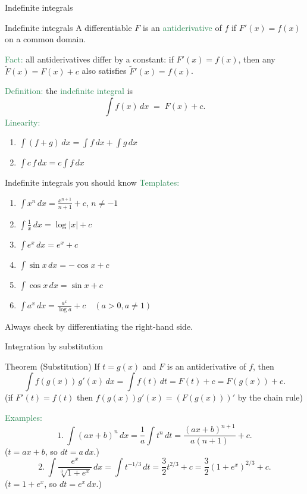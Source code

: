\documentclass[11pt]{beamer}
\begin{document}
\begin{frame} \begin{center}
	\alert{\Huge Indefinite integrals}
\end{center}\end{frame}


\begin{frame}{Indefinite integrals}
A differentiable $F$ is an \textcolor{SeaGreen}{antiderivative} of $f$ if $F'(x)=f(x)$ on a common domain.
\bigskip

\textcolor{SeaGreen}{Fact:} all antiderivatives differ by a constant: if $F'(x)=f(x)$, then any $\tilde F(x)=F(x)+c$ also satisfies $\tilde F'(x)=f(x)$.
\bigskip

\textcolor{SeaGreen}{Definition:} the \textcolor{SeaGreen}{indefinite integral} is
\[
\int f(x)\,dx \;=\; F(x)+c.
\]
\textcolor{SeaGreen}{Linearity:}
\begin{enumerate}
\item $\int (f+g)\,dx=\int f\,dx+\int g\,dx$
\item $\int c\,f\,dx=c\int f\,dx$
\end{enumerate}
\end{frame}

\begin{frame}{Indefinite integrals you should know}
\textcolor{SeaGreen}{Templates:}
\begin{enumerate}
\item $\displaystyle \int x^n\,dx=\frac{x^{n+1}}{n+1}+c$, $n\neq -1$ \quad 
\item $\displaystyle \int \frac{1}{x}\,dx=\log|x|+c$
\item $\displaystyle \int e^x\,dx=e^x+c$
\item $\displaystyle \int \sin x\,dx=-\cos x+c$
\item $\displaystyle \int \cos x\,dx=\sin x+c$
\item $\displaystyle \int a^x\,dx=\frac{a^x}{\log a}+c \quad (a>0,a\neq 1)$
\end{enumerate}
{\small Always check by differentiating the right-hand side.}
\end{frame}

\begin{frame}{Integration by substitution}
\begin{block}{Theorem (Substitution)}
If $t=g(x)$ and $F$ is an antiderivative of $f$, then
\[
\int f(g(x))\,g'(x)\,dx=\int f(t)\,dt=F(t)+c=F(g(x))+c.
\]
{\small (if $F'(t)=f(t)$ then $f(g(x))g'(x)=(F(g(x)))'$ by the chain rule)}
\end{block}
\textcolor{SeaGreen}{Examples:}
\[
1.\ \int (ax+b)^n\,dx
= \frac{1}{a}\int t^n\,dt
= \frac{(ax+b)^{n+1}}{a(n+1)}+c.
\]
{\tiny ($t=ax+b$, so $dt=a\,dx$.)}
\[
2.\ \int \frac{e^x}{\sqrt[3]{1+e^x}}\,dx
= \int t^{-1/3}\,dt
= \frac{3}{2}t^{2/3}+c
= \frac{3}{2}(1+e^x)^{2/3}+c.
\]
{\tiny ($t=1+e^x$, so $dt=e^x\,dx$.)}
\end{frame}
\end{document}
